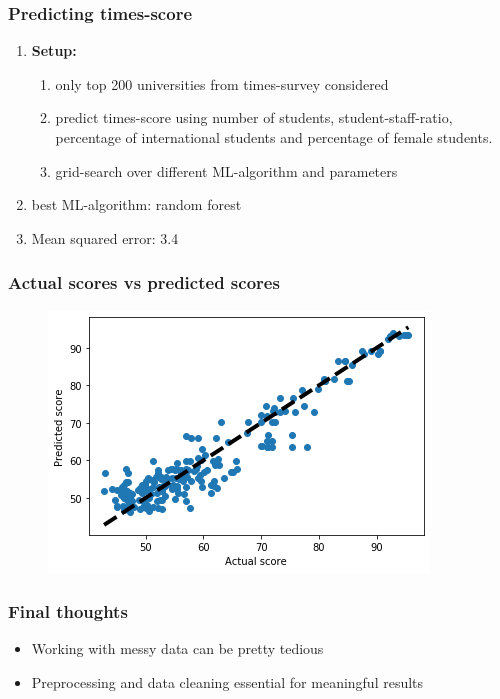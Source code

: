 \documentclass[mathserif,notheorems,11pt]{beamer}
\begin{document}
\begin{frame} 
\frametitle{Predicting times-score}

\begin{enumerate}
\item \textbf{Setup:}

\begin{enumerate}
\item only top 200 universities from times-survey considered
\item predict times-score using number of students, student-staff-ratio, percentage of international students and percentage of female students.
\item grid-search over different ML-algorithm and parameters
\end{enumerate}

\item best ML-algorithm: random forest

\item Mean squared error: 3.4
\end{enumerate}

\end{frame}

\begin{frame}
\frametitle{Actual scores vs predicted scores}
\begin{figure}
\centering
\includegraphics[width=1\linewidth]{graphs/pred_uniFeatures_unirank}
\end{figure}

\end{frame}

\begin{frame} 
\frametitle{Final thoughts}
\begin{itemize}

\item Working with messy data can be pretty tedious

\item Preprocessing and data cleaning essential for meaningful results

\end{itemize}


\end{frame}
\end{document}
